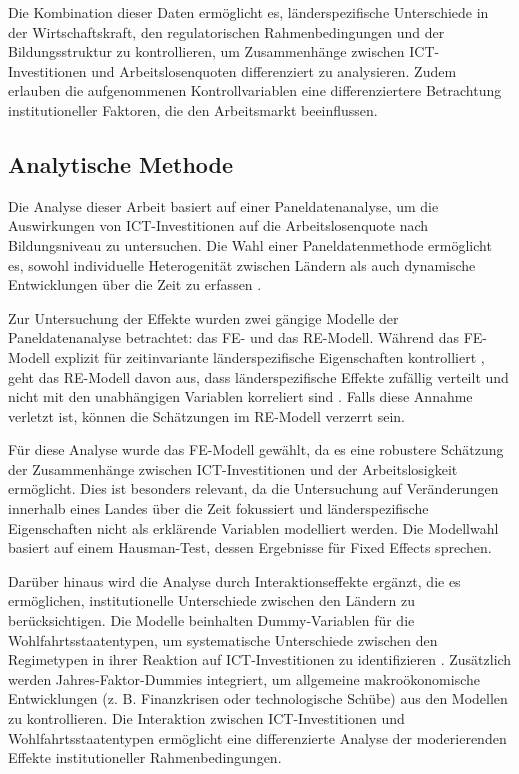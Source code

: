 Die Kombination dieser Daten ermöglicht es, länderspezifische Unterschiede in der Wirtschaftskraft, 
den regulatorischen Rahmenbedingungen und der Bildungsstruktur zu kontrollieren, um Zusammenhänge 
zwischen ICT-Investitionen und Arbeitslosenquoten differenziert zu analysieren. Zudem erlauben die 
aufgenommenen Kontrollvariablen eine differenziertere Betrachtung institutioneller Faktoren, die 
den Arbeitsmarkt beeinflussen.

\subsection{Analytische Methode}

Die Analyse dieser Arbeit basiert auf einer Paneldatenanalyse, um die Auswirkungen von 
\ac{ICT}-Investitionen auf die Arbeitslosenquote nach Bildungsniveau zu untersuchen. Die Wahl 
einer Paneldatenmethode ermöglicht es, sowohl individuelle Heterogenität zwischen Ländern als auch 
dynamische Entwicklungen über die Zeit zu erfassen \parencite{wooldridge2010econometric}.

Zur Untersuchung der Effekte wurden zwei gängige Modelle der Paneldatenanalyse betrachtet: das 
\ac{FE}- und das \ac{RE}-Modell. Während das \ac{FE}-Modell explizit für zeitinvariante 
länderspezifische Eigenschaften kontrolliert \parencite[S. 251–256]{wooldridge2010econometric}, 
geht das \ac{RE}-Modell davon aus, dass länderspezifische Effekte zufällig verteilt und nicht mit 
den unabhängigen Variablen korreliert sind \parencite[S. 17–20]{baltagi2021econometric}. Falls 
diese Annahme verletzt ist, können die Schätzungen im \ac{RE}-Modell verzerrt sein.

Für diese Analyse wurde das \ac{FE}-Modell gewählt, da es eine robustere Schätzung der 
Zusammenhänge zwischen \ac{ICT}-Investitionen und der Arbeitslosigkeit ermöglicht. Dies ist 
besonders relevant, da die Untersuchung auf Veränderungen innerhalb eines Landes über die Zeit 
fokussiert und länderspezifische Eigenschaften nicht als erklärende Variablen modelliert werden. 
Die Modellwahl basiert auf einem Hausman-Test, dessen Ergebnisse für Fixed Effects sprechen.

Darüber hinaus wird die Analyse durch Interaktionseffekte ergänzt, die es ermöglichen, 
institutionelle Unterschiede zwischen den Ländern zu berücksichtigen. Die Modelle beinhalten 
Dummy-Variablen für die Wohlfahrtsstaatentypen, um systematische Unterschiede zwischen den 
Regimetypen in ihrer Reaktion auf \ac{ICT}-Investitionen zu identifizieren 
\parencite{espingandersen1990thethree}. Zusätzlich werden Jahres-Faktor-Dummies integriert, um 
allgemeine makroökonomische Entwicklungen (z. B. Finanzkrisen oder technologische Schübe) aus den 
Modellen zu kontrollieren. Die Interaktion zwischen ICT-Investitionen und Wohlfahrtsstaatentypen 
ermöglicht eine differenzierte Analyse der moderierenden Effekte institutioneller Rahmenbedingungen.

